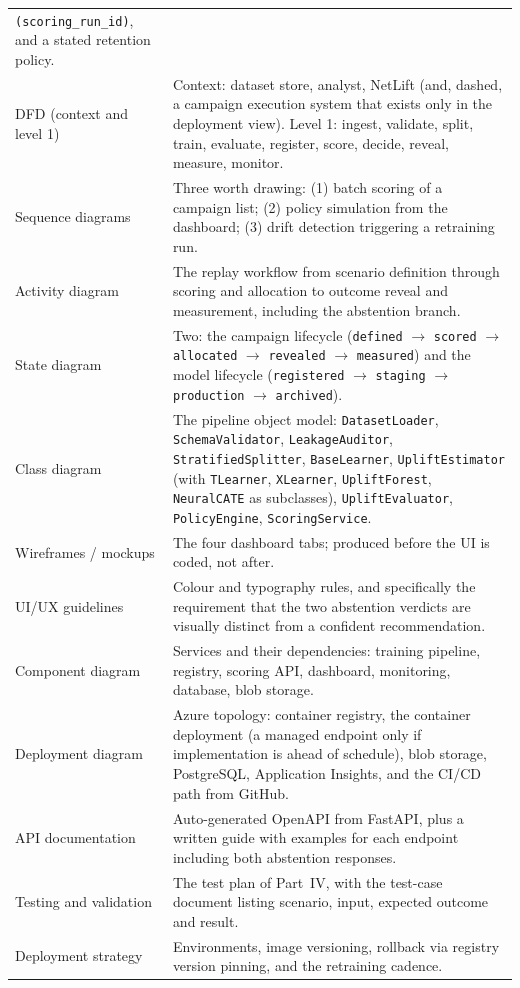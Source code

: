 \documentclass[11pt,a4paper]{article}
\begin{document}
\begin{longtable}{@{}L{3.8cm}L{10.6cm}@{}}
\texttt{(scoring\_run\_id)}, and a stated retention policy. \\
DFD (context and level 1) & Context: dataset store, analyst, NetLift (and, dashed,
a campaign execution system that exists only in the deployment view). Level 1: ingest, validate,
split, train, evaluate, register, score, decide, reveal, measure, monitor. \\
Sequence diagrams & Three worth drawing: (1) batch scoring of a campaign list; (2) policy
simulation from the dashboard; (3) drift detection triggering a retraining run. \\
Activity diagram & The replay workflow from scenario definition through scoring and allocation to
outcome reveal and measurement, including the abstention branch. \\
State diagram & Two: the campaign lifecycle
(\texttt{defined} $\to$ \texttt{scored} $\to$ \texttt{allocated} $\to$ \texttt{revealed} $\to$
\texttt{measured}) and the model lifecycle
(\texttt{registered} $\to$ \texttt{staging} $\to$ \texttt{production} $\to$ \texttt{archived}). \\
Class diagram & The pipeline object model: \texttt{DatasetLoader}, \texttt{SchemaValidator},
\texttt{LeakageAuditor}, \texttt{StratifiedSplitter}, \texttt{BaseLearner},
\texttt{UpliftEstimator} (with \texttt{TLearner}, \texttt{XLearner}, \texttt{UpliftForest},
\texttt{NeuralCATE} as subclasses), \texttt{UpliftEvaluator}, \texttt{PolicyEngine},
\texttt{ScoringService}. \\
Wireframes / mockups & The four dashboard tabs; produced before the UI is coded, not after. \\
UI/UX guidelines & Colour and typography rules, and specifically the requirement that the two
abstention verdicts are visually distinct from a confident recommendation. \\
Component diagram & Services and their dependencies: training pipeline, registry, scoring API,
dashboard, monitoring, database, blob storage. \\
Deployment diagram & Azure topology: container registry, the container deployment (a managed
endpoint only if implementation is ahead of schedule), blob storage,
PostgreSQL, Application Insights, and the CI/CD path from GitHub. \\
API documentation & Auto-generated OpenAPI from FastAPI, plus a written guide with examples for
each endpoint including both abstention responses. \\
Testing and validation & The test plan of Part~IV, with the test-case document listing scenario,
input, expected outcome and result. \\
Deployment strategy & Environments, image versioning, rollback via registry version pinning,
and the retraining cadence. \\
\bottomrule
\end{longtable}
\end{document}
